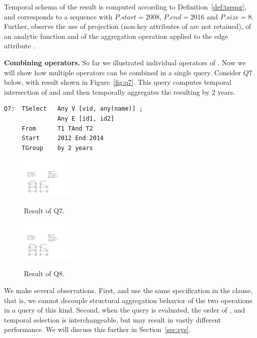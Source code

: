 Temporal schema of the result is computed according to
Definition~\ref{def:tseqor}, and corresponds to a sequence with
$P.start = 2008$, $P.end=2016$ and $P.size=8$.  Further, observe the
use of projection (non-key attributes of  are not retained),
of an analytic function  and of the aggregation
operation  applied to the edge attribute .

{\bf Combining operators.}  So far we illustrated individual operators
of \ql.  Now we will show how multiple operators can be combined in a
single query.  Consider $Q7$ below, with result shown in
Figure~\ref{fig:q7}. This query computes temporal intersection of
 and  and then temporally aggregates the resulting
\tg by 2 years.

\begin{verbatim}
Q7:  TSelect   Any V [vid, any(name)] ;
               Any E [id1, id2]
     From      T1 TAnd T2
     Start     2012 End 2014
     TGroup    by 2 years
\end{verbatim}

\begin{figure}
\centering
\begin{minipage}{1.6in}
  \centering
  \includegraphics[width=1in]{figs/q7.pdf}
  \caption{Result of Q7.}{}
  \label{fig:q7}
\end{minipage}%
\begin{minipage}{1.6in}
  \centering
  \includegraphics[width=1in]{figs/q8.pdf}
  \caption{Result of Q8.}{}
  \label{fig:q8}
\end{minipage}
\end{figure}

We make several observations.  First,  and 
use the same specification in the  clause, that is, we
cannot decouple structural aggregation behavior of the two operations
in a query of this kind. Second, when the query is evaluated, the
order of ,  and temporal selection is
interchangeable, but may result in vastly different performance.  We
will discuss this further in Section~\ref{sec:sys}.

